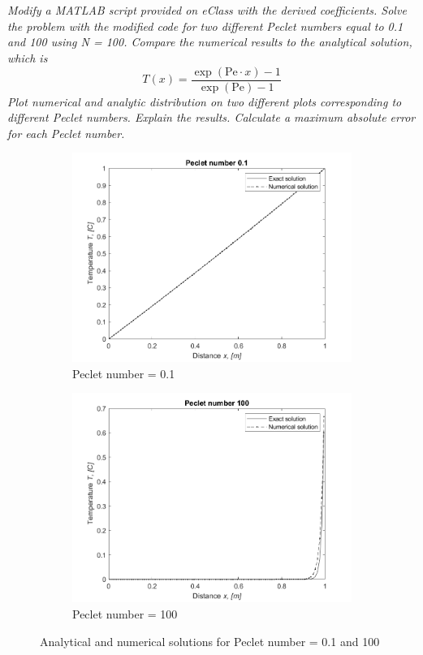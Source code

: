 \section{}
\textit{Modify a MATLAB script provided on eClass with the derived coefficients. Solve the problem with the modified code for two different Peclet numbers equal to 0.1 and 100 using N = 100. Compare the numerical results to the analytical solution, which is}
\[
    T(x) = \frac{\exp(\text{Pe} \cdot x) - 1}{\exp(\text{Pe}) - 1}
\]
\textit{Plot numerical and analytic distribution on two different plots corresponding to different Peclet numbers. Explain the results. Calculate a maximum absolute error for each Peclet number.} \\
\begin{figure}[H]
    \centering
    \begin{subfigure}{0.7\textwidth}
        \centering
        \includegraphics[width=\textwidth]{Questions/Code/peclet_0.1.png}
        \caption{Peclet number = 0.1}
    \end{subfigure}
    \begin{subfigure}{0.7\textwidth}
        \centering
        \includegraphics[width=\textwidth]{Questions/Code/peclet_100.png}
        \caption{Peclet number = 100}
    \end{subfigure}
    \caption{Analytical and numerical solutions for Peclet number = 0.1 and 100}
\end{figure}
